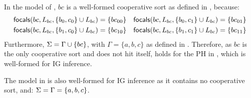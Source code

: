 \begin{example*}
In the model of , $bc$ is a well-formed cooperative sort as defined in , because:
\begin{align*}
\mathsf{focals}(bc, L_{bc}, \{b_0, c_0\} \cup L_{bc}) = \{bc_{00}\} && \mathsf{focals}(bc, L_{bc}, \{b_0, c_1\} \cup L_{bc}) = \{bc_{01}\} \\
\mathsf{focals}(bc, L_{bc}, \{b_1, c_0\} \cup L_{bc}) = \{bc_{10}\} && \mathsf{focals}(bc, L_{bc}, \{b_1, c_1\} \cup L_{bc}) = \{bc_{11}\}
\end{align*}
Furthermore, $\Sigma = \Gamma \cup \{bc\}$, with $\Gamma = \{a, b, c\}$ as defined in .
Therefore, as $bc$ is the only cooperative sort and does not hit itself,
 holds for the PH in , which is well-formed for IG inference.

The model in  is also well-formed for IG inference as it contains no cooperative sort, and: $\Sigma = \Gamma = \{a, b, c\}$.
\end{example*}


\begin{comment}
\begin{center}
\begin{tikzpicture}
\TSetSortLabel{a}{b}
\TSetSortLabel{b}{c}
\TSetSortLabel{z}{a}
\TSetSortLabel{ab}{bc}
\TSort{(0,3)}{a}{2}{l}
\TSort{(0,0)}{b}{2}{l}
\TSetTick{ab}{0}{00}
\TSetTick{ab}{1}{01}
\TSetTick{ab}{2}{10}
\TSetTick{ab}{3}{11}
\TSort{(3,0.5)}{ab}{4}{r}
\TSort{(6,1)}{z}{3}{r}

\THit{a_1}{}{ab_0}{.west}{ab_2}
\THit{a_1}{}{ab_1}{.west}{ab_3}
\path[bounce,bend left] \TBounce{ab_0}{}{ab_2}{.south} \TBounce{ab_1}{}{ab_3}{.south};

\THit{a_0}{}{ab_2}{.west}{ab_0}
\THit{a_0}{}{ab_3}{.west}{ab_1}
\path[bounce,bend right] \TBounce{ab_2}{}{ab_0}{.north} \TBounce{ab_3}{}{ab_1}{.north};

\THit{b_0}{}{ab_3}{.west}{ab_2}
\THit{b_0}{}{ab_1}{.west}{ab_0}
\THit{b_1}{}{ab_0}{.west}{ab_1}
\THit{b_1}{}{ab_2}{.west}{ab_3}
\path[bounce,bend right] \TBounce{ab_1}{}{ab_0}{.north} \TBounce{ab_3}{}{ab_2}{.north};
\path[bounce,bend left] \TBounce{ab_0}{}{ab_1}{.south} \TBounce{ab_2}{}{ab_3}{.south};

\THit{ab_2}{}{z_1}{.north west}{z_2}
\THit{ab_2}{}{z_0}{.north west}{z_1}
\path[bounce,bend left] \TBounce{z_1}{}{z_2}{.south} \TBounce{z_0}{}{z_1}{.south};
\THit{ab_3}{}{z_2}{.south west}{z_1}
\THit{ab_3}{}{z_0}{.north west}{z_1}
\path[bounce,bend left] \TBounce{z_2}{bend right}{z_1}{.north} \TBounce{z_0}{}{z_1}{.south};
\THit{ab_1}{}{z_2}{.south west}{z_1}
\THit{ab_1}{}{z_1}{.south west}{z_0}
\path[bounce,bend right] \TBounce{z_2}{}{z_1}{.north} \TBounce{z_1}{}{z_0}{.north};
\THit{ab_0}{}{z_2}{.south west}{z_1}
\THit{ab_0}{}{z_1}{.south west}{z_0}
\path[bounce,bend right] \TBounce{z_2}{}{z_1}{.north} \TBounce{z_1}{}{z_0}{.north};
\end{tikzpicture}
\end{center}
\end{comment}

